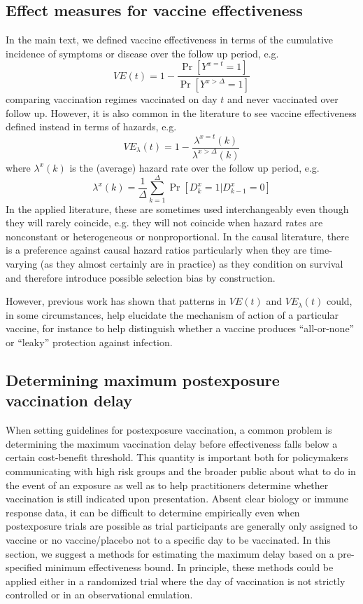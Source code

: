 \begin{appendices}
\begin{refsection}
    \subsection{Effect measures for vaccine effectiveness} \label{sec:effect_measures}
    In the main text, we defined vaccine effectiveness in terms of the cumulative incidence of symptoms or disease over the follow up period, e.g.
    $$
    VE(t) = 1 - \frac{\Pr[Y^{x=t} = 1]}{\Pr[Y^{x > \Delta} = 1]}
    $$ 
    comparing vaccination regimes vaccinated on day $t$ and never vaccinated over follow up. However, it is also common in the literature to see vaccine effectiveness defined instead in terms of hazards, e.g.
    $$
    VE_\lambda(t) = 1 - \frac{\lambda^{x=t}(k)}{\lambda^{x > \Delta}(k)}
    $$ 
    where $\lambda^x(k)$ is the (average) hazard rate over the follow up period, e.g.
    $$
    \lambda^x(k) = \frac{1}{\Delta}\sum_{k=1}^{\Delta}\Pr[D_k^{x} = 1 | D_{k-1}^{x} = 0]
    $$ 
    In the applied literature, these are sometimes used interchangeably even though they will rarely coincide, e.g. they will not coincide when hazard rates are nonconstant or heterogeneous or nonproportional. In the causal literature, there is a preference against causal hazard ratios particularly when they are time-varying (as they almost certainly are in practice) as they condition on survival and therefore introduce possible selection bias by construction. 

    However, previous work \cite{smith_assessment_1984} has shown that patterns in $VE(t)$ and $VE_\lambda(t)$ could, in some circumstances, help elucidate the mechanism of action of a particular vaccine, for instance to help distinguish whether a vaccine produces ``all-or-none'' or ``leaky'' protection against infection. 
    \clearpage

    \subsection{Determining maximum postexposure vaccination delay} \label{sec:maxdelay}
    When setting guidelines for postexposure vaccination, a common problem is determining the maximum vaccination delay before effectiveness falls below a certain cost-benefit threshold. This quantity is important both for policymakers communicating with high risk groups and the broader public about what to do in the event of an exposure as well as to help practitioners determine whether vaccination is still indicated upon presentation. Absent clear biology or immune response data, it can be difficult to determine empirically even when postexposure trials are possible as trial participants are generally only assigned to vaccine or no vaccine/placebo not to a specific day to be vaccinated. In this section, we suggest a methods for estimating the maximum delay based on a pre-specified minimum effectiveness bound. In principle, these methods could be applied either in a randomized trial where the day of vaccination is not strictly controlled or in an observational emulation. 
 

\end{refsection}
\end{appendices}

